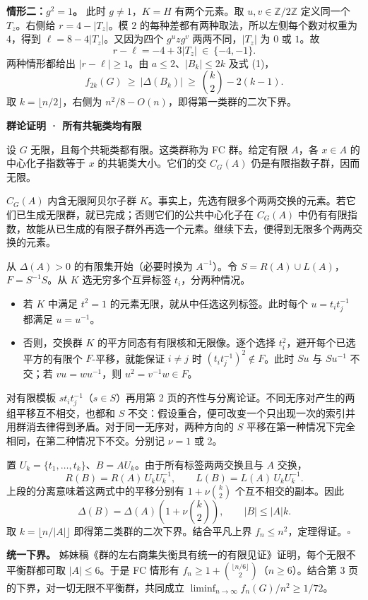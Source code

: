\documentclass[11pt,a4paper]{article}
\newcommand{\banner}[1]{{\small\color{accent}\bfseries 群论\hfill #1}\par\vspace{-3pt}{\color{rulecol}\rule{\linewidth}{.7pt}}\par}
\newcommand{\head}[1]{\par\vspace{2pt}{\large\bfseries\color{accent}#1}\par}
\newcommand{\dd}{\Delta}
\begin{document}
\textbf{情形二：$g^2=1$。} 此时 $g\ne1$，$K=H$ 有两个元素。取 $u,v\in\mathbb Z/2\mathbb Z$ 定义同一个 $T_z$。右侧给 $r=4-|T_z|$。模 $2$ 的每种差都有两种取法，所以左侧每个数对权重为 $4$，得到 $\ell=8-4|T_z|$。又因为四个 $g^uzg^v$ 两两不同，$|T_z|$ 为 $0$ 或 $1$。故
\[
 r-\ell=-4+3|T_z|\ \in\ \{-4,-1\}.
\]
两种情形都给出 $|r-\ell|\ge1$。由 $a\le2$、$|B_k|\le2k$ 及式 (1)，
\[
 f_{2k}(G)\ \ge\ |\dd(B_k)|\ \ge\ \binom{k}{2}-2(k-1).
\]
取 $k=\lfloor n/2\rfloor$，右侧为 $n^2/8-O(n)$，即得第一类群的二次下界。

\newpage
\banner{证明 · 所有共轭类均有限}
\head{四、让每对副本都扩大差值}
设 $G$ 无限，且每个共轭类都有限。这类群称为 FC 群。给定有限 $A$，各 $x\in A$ 的中心化子指数等于 $x$ 的共轭类大小。它们的交 $C_G(A)$ 仍是有限指数子群，因而无限。

$C_G(A)$ 内含无限阿贝尔子群 $K$。事实上，先选有限多个两两交换的元素。若它们已生成无限群，就已完成；否则它们的公共中心化子在 $C_G(A)$ 中仍有有限指数，故能从已生成的有限子群外再选一个元素。继续下去，便得到无限多个两两交换的元素。

从 $\dd(A)>0$ 的有限集开始（必要时换为 $A^{-1}$）。令 $S=R(A)\cup L(A)$，$F=S^{-1}S$。从 $K$ 选无穷多个互异标签 $t_i$，分两种情况。

\begin{itemize}
\item 若 $K$ 中满足 $t^2=1$ 的元素无限，就从中任选这列标签。此时每个 $u=t_i t_j^{-1}$ 都满足 $u=u^{-1}$。
\item 否则，交换群 $K$ 的平方同态有有限核和无限像。逐个选择 $t_i^2$，避开每个已选平方的有限个 $F$-平移，就能保证 $i\ne j$ 时 $(t_it_j^{-1})^2\notin F$。此时 $Su$ 与 $Su^{-1}$ 不交；若 $vu=wu^{-1}$，则 $u^2=v^{-1}w\in F$。
\end{itemize}

对有限模板 $st_i t_j^{-1}$（$s\in S$）再用第 2 页的齐性与分离论证。不同无序对产生的两组平移互不相交，也都和 $S$ 不交：假设重合，便可改变一个只出现一次的索引并用群消去律得到矛盾。对于同一无序对，两种方向的 $S$ 平移在第一种情况下完全相同，在第二种情况下不交。分别记 $\nu=1$ 或 $2$。

置 $U_k=\{t_1,\dots,t_k\}$、$B=A U_k$。由于所有标签两两交换且与 $A$ 交换，
\[
 R(B)=R(A)\,U_kU_k^{-1},\qquad L(B)=L(A)\,U_kU_k^{-1}.
\]
上段的分离意味着这两式中的平移分别有 $1+\nu\binom{k}{2}$ 个互不相交的副本。因此
\[
 \dd(B)=\dd(A)\left(1+\nu\binom{k}{2}\right),\qquad |B|\le |A|k .
\]
取 $k=\lfloor n/|A|\rfloor$ 即得第二类群的二次下界。结合平凡上界 $f_n\le n^2$，定理得证。\hfill$\square$

\textbf{统一下界。} 姊妹稿《群的左右商集失衡具有统一的有限见证》证明，每个无限不平衡群都可取 $|A|\le6$。于是 FC 情形有 $f_n\ge 1+\binom{\lfloor n/6\rfloor}{2}$（$n\ge6$）。结合第 3 页的下界，对一切无限不平衡群，共同成立 $\liminf_{n\to\infty} f_n(G)/n^2\ge1/72$。
\end{document}
